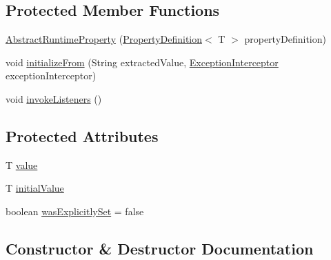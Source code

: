 \subsection*{Protected Member Functions}
\begin{DoxyCompactItemize}
\item 
\mbox{\hyperlink{classcom_1_1mysql_1_1cj_1_1conf_1_1_abstract_runtime_property_a434e0683cc5b95d04f26ee6d908fcaf6}{Abstract\+Runtime\+Property}} (\mbox{\hyperlink{interfacecom_1_1mysql_1_1cj_1_1conf_1_1_property_definition}{Property\+Definition}}$<$ T $>$ property\+Definition)
\item 
void \mbox{\hyperlink{classcom_1_1mysql_1_1cj_1_1conf_1_1_abstract_runtime_property_a6df5f05e9054868bc4cca590b49f1295}{initialize\+From}} (String extracted\+Value, \mbox{\hyperlink{interfacecom_1_1mysql_1_1cj_1_1exceptions_1_1_exception_interceptor}{Exception\+Interceptor}} exception\+Interceptor)
\item 
void \mbox{\hyperlink{classcom_1_1mysql_1_1cj_1_1conf_1_1_abstract_runtime_property_a52fb1662461037f71b84d92b2286df8f}{invoke\+Listeners}} ()
\end{DoxyCompactItemize}
\subsection*{Protected Attributes}
\begin{DoxyCompactItemize}
\item 
T \mbox{\hyperlink{classcom_1_1mysql_1_1cj_1_1conf_1_1_abstract_runtime_property_ac83f2926daba2525ee721f21254c8d6f}{value}}
\item 
T \mbox{\hyperlink{classcom_1_1mysql_1_1cj_1_1conf_1_1_abstract_runtime_property_a2d12fa3201de2f5dcdc5d46157f5de3e}{initial\+Value}}
\item 
boolean \mbox{\hyperlink{classcom_1_1mysql_1_1cj_1_1conf_1_1_abstract_runtime_property_a7669f0af6741f751d6b68ffa9b0f9bb5}{was\+Explicitly\+Set}} = false
\end{DoxyCompactItemize}


\subsection{Constructor \& Destructor Documentation}
\mbox{\label{classcom_1_1mysql_1_1cj_1_1conf_1_1_abstract_runtime_property_a7f22d3e4a9a8d8a6bc6281269afbe06b}} 
